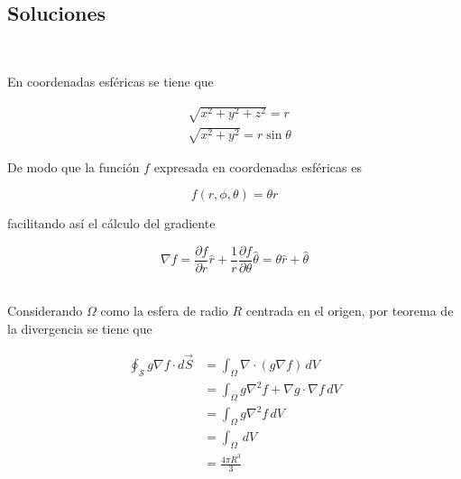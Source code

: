 \subsection{Soluciones}

\\
\bigbreak

En coordenadas esféricas se tiene que

\begin{equation}
\begin{split}
    &\sqrt{x^2+y^2+z^2}=r\\
    &\sqrt{x^2+y^2}= r\sin{\theta}
\end{split}
\nonumber
\end{equation}

De modo que la función $f$ expresada en coordenadas esféricas es

\[f(r,\phi,\theta)=\theta r\]

facilitando así el cálculo del gradiente

    \[\nabla f = \frac{\partial f}{\partial r}\hat{r}
    +\frac{1}{r}\frac{\partial f}{\partial \theta}\hat{\theta}=\theta\hat{r}+\hat{\theta}\]

\bigbreak
\bigbreak

\\
\bigbreak
Considerando $\Omega$ como la esfera de radio $R$ centrada en el origen, por teorema de la divergencia se tiene que

\begin{equation}
\begin{split}
    \oint_\mathcal{S} g\nabla f\cdot d\Vec{S}&=\int_\Omega
    \nabla\cdot\left(g\nabla f\right)\,dV\\
    &= \int_\Omega g\nabla^2 f+\nabla g\cdot\nabla f\,dV\\
    &= \int_\Omega g\nabla^2 f\,dV\\
    &= \int_\Omega\,dV\\
    &=\frac{4\pi R^3}{3}
\end{split}
\nonumber
\end{equation}

\newpage

\\
\bigbreak

